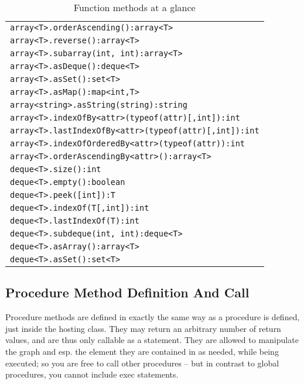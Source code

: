 \begin{table}[htbp]
\begin{tabular}{|l|}
\texttt{array<T>.orderAscending():array<T>}\\
\texttt{array<T>.reverse():array<T>}\\
\texttt{array<T>.subarray(int, int):array<T>}\\
\texttt{array<T>.asDeque():deque<T>}\\
\texttt{array<T>.asSet():set<T>}\\
\texttt{array<T>.asMap():map<int,T>}\\
\texttt{array<string>.asString(string):string}\\
\hline
\texttt{array<T>.indexOfBy<attr>(typeof(attr)[,int]):int}\\
\texttt{array<T>.lastIndexOfBy<attr>(typeof(attr)[,int]):int}\\
\texttt{array<T>.indexOfOrderedBy<attr>(typeof(attr)):int}\\
\texttt{array<T>.orderAscendingBy<attr>():array<T>}\\
\hline
\texttt{deque<T>.size():int}\\
\texttt{deque<T>.empty():boolean}\\
\texttt{deque<T>.peek([int]):T}\\
\texttt{deque<T>.indexOf(T[,int]):int}\\
\texttt{deque<T>.lastIndexOf(T):int}\\
\texttt{deque<T>.subdeque(int, int):deque<T>}\\
\texttt{deque<T>.asArray():array<T>}\\
\texttt{deque<T>.asSet():set<T>}\\
\hline
\end{tabular}
\caption{Function methods at a glance}
\label{funcmethstab}
\end{table}

\subsection{Procedure Method Definition And Call}\label{sub:proceduremethods}\label{sec:procmethcall} 

Procedure methods are defined in exactly the same way as a procedure is defined, just inside the hosting class.
They may return an arbitrary number of return values, and are thus only callable as a statement.
They are allowed to manipulate the graph and esp. the element they are contained in as needed, while being executed;
so you are free to call other procedures -- but in contrast to global procedures, you cannot include exec statements.

